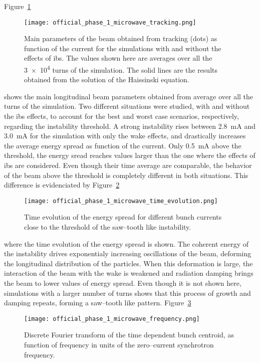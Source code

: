     Figure~\ref{fig:ph1_microwave_tracking}
    \begin{figure}
        \centering
        \texttt{[image: official\_phase\_1\_microwave\_tracking.png]}
        \caption[Longitudinal beam parameters obtained from tracking.]{Main parameters of the beam obtained from tracking (dots) as function of the current for the simulations with and without the effects of \gls{ibs}. The values shown here are averages over all the \num{3e4} turns of the simulation. The solid lines are the results obtained from the solution of the Haissinski equation.}
        \label{fig:ph1_microwave_tracking}
    \end{figure}
    shows the main longitudinal beam parameters obtained from average over all the turns of the simulation. Two different situations were studied, with and without the \gls{ibs} effects, to account for the best and worst case scenarios, respectively, regarding the instability threshold. A strong instability rises between \SI{2.8}{\milli\ampere} and \SI{3.0}{\milli\ampere} for the simulation with only the wake effects, and drastically increases the average energy spread as function of the current. Only \SI{0.5}{\milli\ampere} above the threshold, the energy sread reaches values larger than the one where the effects of \gls{ibs} are considered. Even though their time average are comparable, the behavior of the beam above the threshold is completely different in both situations. This difference is evidenciated by
    Figure~\ref{fig:ph1_microwave_time_evolution}
    \begin{figure}
        \centering
        \texttt{[image: official\_phase\_1\_microwave\_time\_evolution.png]}
        \caption{Time evolution of the energy spread for different bunch currents close to the threshold of the saw--tooth like instability.}
        \label{fig:ph1_microwave_time_evolution}
    \end{figure}
    where the time evolution of the energy spread is shown. The coherent energy of the instability drives exponentialy increasing oscillations of the beam, deforming the longitudinal distribution of the particles. When this deformation is large, the interaction of the beam with the wake is weakened and radiation damping brings the beam to lower values of energy spread. Even though it is not shown here, simulations with a larger number of turns shows that this process of growth and damping repeats, forming a saw--tooth like pattern.
    Figure~\ref{fig:ph1_microwave_frequency}
    \begin{figure}
        \centering
        \texttt{[image: official\_phase\_1\_microwave\_frequency.png]}
        \caption{Discrete Fourier transform of the time dependent bunch centroid, as function of frequency in units of the zero--current synchrotron frequency.}
        \label{fig:ph1_microwave_frequency}
    \end{figure}
